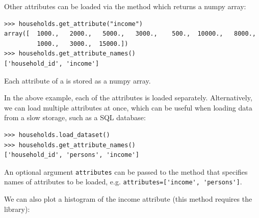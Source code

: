 Other attributes can be loaded via the  method which
returns a numpy array:
\begin{verbatim}
>>> households.get_attribute("income")
array([  1000.,   2000.,   5000.,   3000.,    500.,  10000.,   8000.,
         1000.,   3000.,  15000.])
>>> households.get_attribute_names()
['household_id', 'income']
\end{verbatim}

Each attribute of a  is stored as a numpy array.

In the above example, each of the attributes is
loaded separately. Alternatively, we can load multiple attributes
at once, which can be useful when loading data from
a slow storage, such as a SQL database:
\begin{verbatim}
>>> households.load_dataset()
>>> households.get_attribute_names()
['household_id', 'persons', 'income']
\end{verbatim}
An optional argument \verb|attributes| can be passed to the 
method that specifies names of attributes to be loaded, e.g. \verb|attributes=['income', 'persons']|.



We can also plot a histogram{} of the income attribute (this method requires the
   library):

